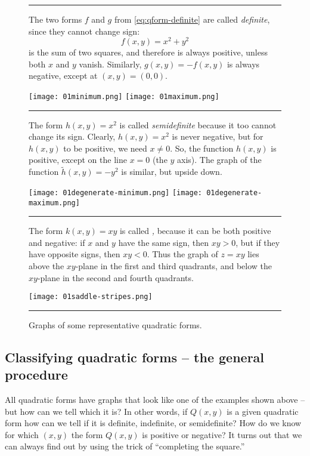 \begin{figure}[b]\flushleft
\color{darkbluegreen}\sffamily
\noindent%
\rule{\textwidth}{1pt}
\noindent%
\begin{minipage}{0.42\textwidth}
  The two forms $f$ and $g$ from \eqref{eq:qform-definite} are called
  \emph{\color{badgerred}definite}, since they cannot change sign:
  \[
    f(x,y) = x^2+y^2
  \]
  is the sum of two squares, and therefore is always positive, unless both $x$
  and $y$ vanish.  Similarly, $g(x,y) = -f(x,y)$ is always negative, except at
  $(x,y) = (0,0)$.
\end{minipage}\hfill
\parbox{0.55\textwidth}{
  \texttt{[image: 01minimum.png]}
  \texttt{[image: 01maximum.png]}
  }


\noindent%
\rule[-0.5ex]{0pt}{1ex}%
\rule{\textwidth}{0.2pt}
\noindent%
\begin{minipage}{0.42\textwidth}
 The form $h(x,y) = x^2$ is called
  \emph{\color{badgerred}semidefinite} because it too cannot change its sign.
  Clearly, $h(x, y)=x^2$ is never negative, but for $h(x, y)$ to be positive, we
  need $x\neq0$.
  So, the function $h(x,y)$ is positive, except on the line $x=0$ (the $y$
  axis).  The graph of the function $\tilde h(x, y) = -y^2$ is similar, but
  upside down.
\end{minipage}
\parbox{0.55\textwidth}{
  \texttt{[image: 01degenerate-minimum.png]}
  \texttt{[image: 01degenerate-maximum.png]}
}


\noindent%
\rule[-0.5ex]{0pt}{1ex}%
\rule{\textwidth}{0.2pt}
\noindent%
\begin{minipage}{0.42\textwidth}
 The form $k(x, y) = xy$ is called \emph{\color{badgerred}{indefinite},} because
 it can be both positive and negative:  if $x$ and $y$ have the same sign, then
 $xy>0$, but if they have opposite signs, then $xy<0$.  Thus the graph of $z=xy$
 lies above the $xy$-plane in the first and third quadrants, and below the
 $xy$-plane in the second and fourth quadrants.
\end{minipage}
\parbox{0.55\textwidth}{%
\def\svgwidth{0.25\textwidth}
  
  \texttt{[image: 01saddle-stripes.png]}
  }

\noindent%
\rule{\textwidth}{1pt}
\caption{Graphs of some representative quadratic forms.}
\label{fig:typical-q-forms}
\end{figure}

\subsection{Classifying quadratic forms -- the general procedure} 
All quadratic forms have graphs that look like one of the examples shown above
-- but how can we tell which it is?  In other words, if $Q(x, y)$ is a given
quadratic form how can we tell if it is definite, indefinite, or semidefinite?
How do we know for which $(x, y)$ the form $Q(x, y)$ is positive or negative?
It turns out that we can always find out by using the trick of ``completing the
square.''

